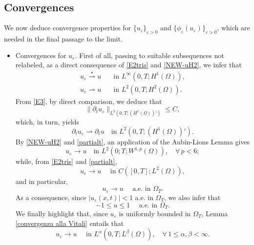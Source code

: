 \documentclass[11pt,  reqno]{amsart}%
\theoremstyle{plain}
\theoremstyle{definition}
\theoremstyle{remark}
\numberwithin{equation}{section}
\newcommand{\ve}{\varepsilon}
\begin{document}
\subsection{Convergences} 
We now deduce convergence properties for $\{ u_{\ve} \}_{\ve>0}$ and $\{ \phi_\ve (u_{\ve}) \}_{\ve>0}$, which are needed in the final passage to the limit.
    
	\begin{itemize}
	    \item Convergences for $u_\ve$. First of all, passing to suitable subsequences not relabeled, as a direct consequence of \eqref{E2tris} and \eqref{NEW-uH2}, we infer that 
        \begin{align}
            u_{\ve} \overset{\star}{\rightharpoonup} u &\quad \mbox{in } L^{\infty}(0,T; H^{1}(\Omega)),  \label{conv2}\\[3pt]
			u_{\ve} \rightharpoonup u &\quad \mbox{in } L^{2}(0,T; H^{2}(\Omega)). \label{conv3}
		\end{align}     
    From \eqref{E3}, by direct comparison, we deduce that
    \begin{equation}
        \label{partialt}
        \|\partial_t u_\ve\|_{L^2(0,T;(H^{1}(\Omega))')} \le C,
    \end{equation}
    which, in turn, yields
    \begin{equation}\label{conv4}
        \partial_t u_{\ve} \rightharpoonup \partial_tu \quad \mbox{in } L^{2}(0,T; (H^{1}(\Omega))'). 
    \end{equation}
    By \eqref{NEW-uH2} and \eqref{partialt}, an application of the Aubin-Lions Lemma gives 
    \begin{equation}
        \label{conv1}
        u_{\ve} \to u \quad \mbox{in } L^2(0;T; W^{1,p}(\Omega)), \quad \forall \, p<6;
    \end{equation}
    while, from \eqref{E2tris} and \eqref{partialt},
    $$u_\ve \to u \quad \textrm{ in }C([0,T];L^2(\Omega)),$$
    and in particular, 
    \begin{equation}
        \label{uae}
        u_\ve \to u \quad \textrm{ a.e. in }\Omega_T.
    \end{equation}
    As a consequence, since $|u_\ve(x,t)|<1$ a.e. in $\Omega_T$, we also infer that 
    \begin{equation}
        \label{u tra -1 e 1}
        -1\le u\le 1 \quad \textrm{ a.e. in }\Omega_T.
    \end{equation}
    We finally highlight that, since $u_\ve$ is uniformly bounded in $\Omega_T$, Lemma \ref{convergenza alla Vitali} entails that
    \begin{equation}
        \label{mega}
        u_\ve \to u \quad \mbox{ in }L^\alpha(0,T;L^\beta(\Omega)), \quad \forall \,  1 \le \alpha,\beta < \infty.
    \end{equation}    
    

\end{itemize}
\end{document}
